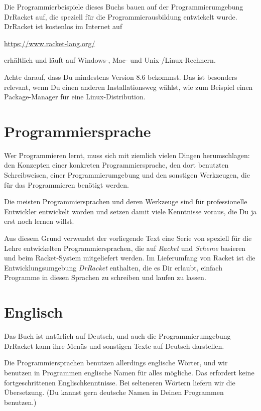 Die Programmierbeispiele dieses Buchs bauen auf der
Programmierumgebung DrRacket{} auf, die speziell
für die Programmierausbildung entwickelt wurde. 
DrRacket ist kostenlos im Internet auf
%
\begin{center}
  \url{https://www.racket-lang.org/}
\end{center}
%
erhältlich und läuft auf Windows-, Mac- und Unix-/Linux-Rechnern.

Achte darauf, dass Du mindestens Version 8.6 bekommst.   Das ist
besonders relevant, wenn Du einen anderen Installationsweg wählst, wie
zum Beispiel einen Package-Manager für eine Linux-Distribution.

\section{Programmiersprache}

Wer Programmieren lernt, muss sich mit ziemlich vielen Dingen
herumschlagen: den Konzepten einer konkreten Programmiersprache, den
dort benutzten Schreibweisen, einer Programmierumgebung und den
sonstigen Werkzeugen, die für das Programmieren benötigt werden.

Die meisten Programmiersprachen und deren Werkzeuge sind für
professionelle Entwickler entwickelt worden und setzen damit viele
Kenntnisse voraus, die Du ja erst noch lernen willst.

Aus diesem Grund verwendet der vorliegende Text eine Serie von
speziell für die Lehre entwickelten Programmiersprachen, die auf
\textit{Racket} und \textit{Scheme}
basieren und beim Racket-System mitgeliefert werden.  Im Lieferumfang von
Racket ist die Entwicklungsumgebung \textit{DrRacket} enthalten, die
es Dir erlaubt, einfach Programme in diesen Sprachen zu schreiben und
laufen zu lassen.

\section{Englisch}

Das Buch ist natürlich auf Deutsch, und auch die Programmierumgebung
DrRacket kann ihre Menüs und sonstigen Texte auf Deutsch darstellen.

Die Programmiersprachen benutzen allerdings englische Wörter, und wir
benutzen in Programmen englische Namen für alles mögliche.  Das
erfordert keine fortgeschrittenen Englischkenntnisse.  Bei
selteneren Wörtern liefern wir die Übersetzung.  (Du kannst gern
deutsche Namen in Deinen Programmen benutzen.)

